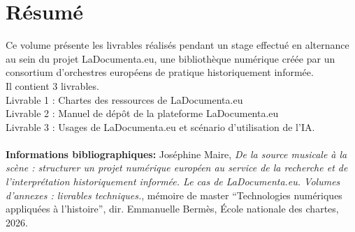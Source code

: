 \documentclass[12pt,twoside]{book}
\begin{document}
	\thispagestyle{empty}	
	\cleardoublepage
	
	\frontmatter
	
	\chapter{Résumé}
	\markboth{}
	\medskip Ce volume présente les livrables réalisés pendant un stage effectué en alternance au sein du projet LaDocumenta.eu, une bibliothèque numérique créée par un consortium d'orchestres européens de pratique historiquement informée.\\
	
	Il contient 3 livrables.\\ 
	Livrable 1 : Chartes des ressources de LaDocumenta.eu\\
	Livrable 2 : Manuel de dépôt de la plateforme LaDocumenta.eu\\
	Livrable 3 : Usages de LaDocumenta.eu et scénario d'utilisation de l'IA.\\\\
	
	\textbf{Informations bibliographiques:} Joséphine Maire, \textit{De la source musicale à la scène : structurer un projet numérique européen au service de la recherche et de l'interprétation historiquement informée. Le cas de LaDocumenta.eu. Volumes d'annexes : livrables techniques.}, mémoire de master \enquote{Technologies numériques appliquées à l'histoire}, dir. Emmanuelle Bermès, École nationale des chartes, 2026.
	
	\newpage{\pagestyle{empty}\cleardoublepage}
	

	
	

	
\mainmatter


\newcommand{\pageblanche}{%
	\clearpage
	\thispagestyle{empty}
	\mbox{}
	\clearpage
}




\pageblanche %



\end{document}
